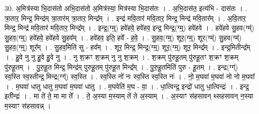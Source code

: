 \documentclass[17pt]{extarticle}
\begin{document}
30. अ॒मित्र॑स्या भि॒दास॑तो अभि॒दास॑तो अ॒मित्र॑स्या॒ मित्र॑स्या भि॒दास॑तः । . अ॒भि॒दास॑त॒ इत्य॑भि - दास॑तः । . त्रा॒तार॒ मिन्द्र॒ मिन्द्र॑म् त्रा॒तार॑म् त्रा॒तार॒ मिन्द्र᳚म् । . इन्द्र॑ मवि॒तार॑ मवि॒तार॒ मिन्द्र॒ मिन्द्र॑ मवि॒तार᳚म् । . अ॒वि॒तार॒ मिन्द्र॒ मिन्द्र॑ मवि॒तार॑ मवि॒तार॒ मिन्द्र᳚म् । . इन्द्र॒(ग्म्॒) हवे॑हवे॒ हवे॑हव॒ इन्द्र॒ मिन्द्र॒(ग्म्॒) हवे॑हवे । . हवे॑हवे सु॒हव(ग्म्॑) सु॒हव॒(ग्म्॒) हवे॑हवे॒ हवे॑हवे सु॒हव᳚म् । . हवे॑हव॒ इति॒ हवे᳚ - ह॒वे॒ । . सु॒हव॒(ग्म्॒) शूर॒(ग्म्॒) शूर(ग्म्॑) सु॒हव(ग्म्॑) सु॒हव॒(ग्म्॒) शूर᳚म् । . सु॒हव॒मिति॑ सु - हव᳚म् । . शूर॒ मिन्द्र॒ मिन्द्र॒(ग्म्॒) शूर॒(ग्म्॒) शूर॒ मिन्द्र᳚म् । . इन्द्र॒मितीन्द्र᳚म् । . हु॒वे नु नु हु॒वे हु॒वे नु । . नु श॒क्रꣳ श॒क्रम् नु नु श॒क्रम् । . श॒क्रम् पु॑रुहू॒तम् पु॑रुहू॒तꣳ श॒क्रꣳ श॒क्रम् पु॑रुहू॒तम् । . पु॒रु॒हू॒त मिन्द्र॒ मिन्द्र॑म् पुरुहू॒तम् पु॑रुहू॒त मिन्द्र᳚म् । . पु॒रु॒हू॒तमिति॑ पुरु - हू॒तम् । . इन्द्र(ग्ग्॑) स्व॒स्ति स्व॒स्तीन्द्र॒ मिन्द्र(ग्ग्॑) स्व॒स्ति । . स्व॒स्ति नो॑ नः स्व॒स्ति स्व॒स्ति नः॑ । . नो॒ म॒घवा॑ म॒घवा॑ नो नो म॒घवा᳚ । . म॒घवा॑ धातु धातु म॒घवा॑ म॒घवा॑ धातु । . म॒घवेति॑ म॒घ - वा॒ । . धा॒त्विन्द्र॒ इन्द्रो॑ धातु धा॒त्विन्द्रः॑ । . इन्द्र॒ इतीन्द्रः॑ । . मा ते॑ ते॒ मा मा ते᳚ । . ते॒ अ॒स्या म॒स्याम् ते॑ ते अ॒स्याम् । . अ॒स्याꣳ स॑हसावन् थ्सहसावन् न॒स्या म॒स्याꣳ स॑हसावन्न् । \newline
\end{document}
